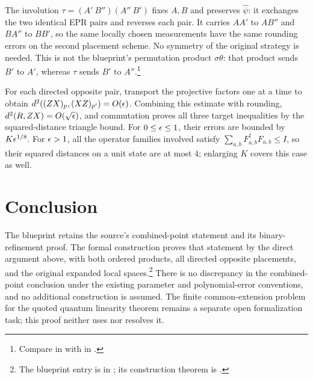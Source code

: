 \documentclass[11pt]{article}
\begin{document}
The involution $\tau=(A'\ B'')(A''\ B')$ fixes $A,B$ and preserves
$\hat\psi$: it exchanges the two identical EPR pairs and reverses each pair.
It carries $AA'$ to $AB''$ and $BA''$ to $BB'$, so the same locally chosen
measurements have the same rounding errors on the second placement scheme.
No symmetry of the original strategy is needed.  This is not the blueprint's
permutation product $\sigma\theta$: that product sends $B'$ to $A'$, whereas
$\tau$ sends $B'$ to $A''$.\footnote{Compare
 in
 with
 in
.}

For each directed opposite pair, transport the projective factors one at a
time to obtain $d^2((ZX)_p,(XZ)_{p'})=O(\epsilon)$.
Combining this estimate with rounding, $d^2(R,ZX)=O(\sqrt{\epsilon})$,
and commutation proves all three target inequalities by the squared-distance
triangle bound.  For $0\leq\epsilon\leq1$, their errors are bounded by
$K\epsilon^{1/8}$.  For $\epsilon>1$, all the operator families involved satisfy
$\sum_{a,b}F_{a,b}^\dagger F_{a,b}\leq I$, so their squared distances on a
unit state are at most $4$; enlarging $K$ covers this case as well.

\section{Conclusion}

The blueprint retains the source's combined-point statement and its
binary-refinement proof.  The formal construction proves that statement by
the direct argument above, with both ordered products, all directed opposite
placements, and the original expanded local spaces.\footnote{The blueprint
entry is  in
; its construction theorem
is .}
There is no discrepancy in the combined-point conclusion under the existing
parameter and polynomial-error conventions, and no additional construction
is assumed.  The finite common-extension problem for the quoted quantum
linearity theorem remains a separate open formalization task; this proof
neither uses nor resolves it.



\end{document}

